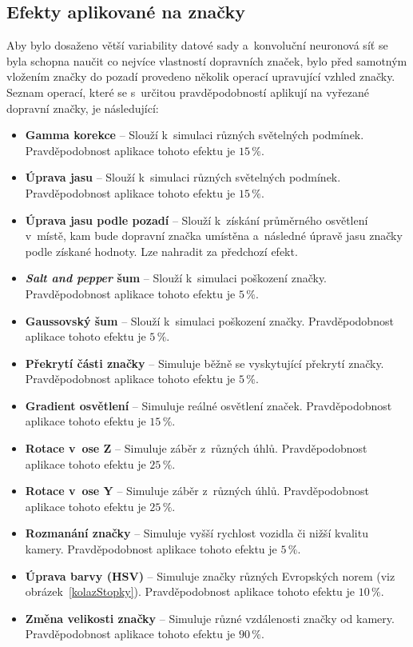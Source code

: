 \subsection*{Efekty aplikované na značky}
\label{syntDatasetEfekty}
Aby bylo dosaženo větší variability datové sady a~konvoluční neuronová síť se byla schopna naučit co nejvíce vlastností dopravních značek, bylo před samotným vložením značky do pozadí provedeno několik operací upravující vzhled značky. Seznam operací, které se s~určitou pravděpodobností aplikují na vyřezané dopravní značky, je následující:

\begin{itemize}
    \item \textbf{Gamma korekce} -- Slouží k~simulaci různých světelných podmínek. Pravděpodobnost aplikace tohoto efektu je $15\,\%$.
    \item \textbf{Úprava jasu} -- Slouží k~simulaci různých světelných podmínek. Pravděpodobnost aplikace tohoto efektu je $15\,\%$.
    \item \textbf{Úprava jasu podle pozadí} -- Slouží k~získání průměrného osvětlení v~místě, kam bude dopravní značka umístěna a~následné úpravě jasu značky podle získané hodnoty. Lze nahradit za předchozí efekt.
    \item \textbf{\emph{Salt and pepper} šum} -- Slouží k~simulaci poškození značky. Pravděpodobnost aplikace tohoto efektu je $5\,\%$.
    \item \textbf{Gaussovský šum} -- Slouží k~simulaci poškození značky. Pravděpodobnost aplikace tohoto efektu je $5\,\%$.
    \item \textbf{Překrytí části značky} -- Simuluje běžně se vyskytující překrytí značky. Pravděpodobnost aplikace tohoto efektu je $5\,\%$.
    \item \textbf{Gradient osvětlení} -- Simuluje reálné osvětlení značek. Pravděpodobnost aplikace tohoto efektu je $15\,\%$.
    \item \textbf{Rotace v~ose Z} -- Simuluje záběr z~různých úhlů. Pravděpodobnost aplikace tohoto efektu je $25\,\%$.
    \item \textbf{Rotace v~ose Y} -- Simuluje záběr z~různých úhlů. Pravděpodobnost aplikace tohoto efektu je $25\,\%$.
    \item \textbf{Rozmanání značky} -- Simuluje vyšší rychlost vozidla či nižší kvalitu kamery. Pravděpodobnost aplikace tohoto efektu je $5\,\%$.
    \item \textbf{Úprava barvy (HSV)} -- Simuluje značky různých Evropských norem (viz obrázek~\ref{kolazStopky}). Pravděpodobnost aplikace tohoto efektu je $10\,\%$.
    \item \textbf{Změna velikosti značky} -- Simuluje různé vzdálenosti značky od kamery. Pravděpodobnost aplikace tohoto efektu je $90\,\%$.
\end{itemize}

